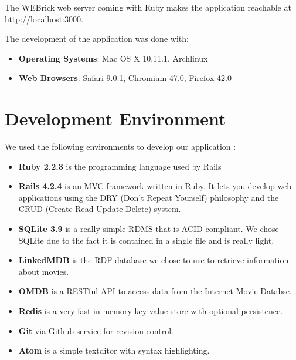 \documentclass[12pt,a4paper]{article}
\begin{document}
The WEBrick web server coming with Ruby makes the application reachable at \url{http://localhost:3000}.

The development of the application was done with:
\begin{itemize}
\item \textbf{Operating Systems}: Mac OS X 10.11.1, Archlinux
\item \textbf{Web Browsers}: Safari 9.0.1, Chromium 47.0, Firefox 42.0
\end{itemize}



\section{Development Environment}\label{dev_plat}

We used the following environments to develop our application :

\begin{itemize}
\item \textbf{Ruby 2.2.3} is the programming language used by Rails
\item \textbf{Rails 4.2.4} is an MVC framework written in Ruby. It lets you develop web applications using the DRY (Don't Repeat Yourself) philosophy and the CRUD (Create Read Update Delete) system.

\item \textbf{SQLite 3.9} is a really simple RDMS that is ACID-compliant. We chose SQLite due to the fact it is contained in a single file and is really light.
\item \textbf{LinkedMDB} is the RDF database we chose to use to retrieve information about movies.
\item \textbf{OMDB} is a RESTful API to access data from the Internet Movie Databse.
\item \textbf{Redis} is a very fast in-memory key-value store with optional persistence.
\item \textbf{Git} via Github service for revision control.
\item \textbf{Atom} is a simple textditor with syntax highlighting.
\end{itemize}


\end{document}
